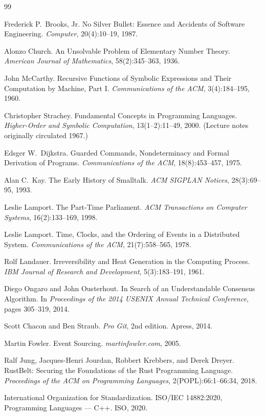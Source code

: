 \documentclass[11pt]{article}
\begin{document}
\begin{thebibliography}{99}

Frederick P.\ Brooks, Jr.
\newblock No Silver Bullet: Essence and Accidents of Software Engineering.
\newblock \emph{Computer}, 20(4):10--19, 1987.

Alonzo Church.
\newblock An Unsolvable Problem of Elementary Number Theory.
\newblock \emph{American Journal of Mathematics}, 58(2):345--363, 1936.

John McCarthy.
\newblock Recursive Functions of Symbolic Expressions and Their Computation by Machine, Part I.
\newblock \emph{Communications of the ACM}, 3(4):184--195, 1960.

Christopher Strachey.
\newblock Fundamental Concepts in Programming Languages.
\newblock \emph{Higher-Order and Symbolic Computation}, 13(1--2):11--49, 2000. (Lecture notes originally circulated 1967.)

Edsger W.\ Dijkstra.
\newblock Guarded Commands, Nondeterminacy and Formal Derivation of Programs.
\newblock \emph{Communications of the ACM}, 18(8):453--457, 1975.

Alan C.\ Kay.
\newblock The Early History of Smalltalk.
\newblock \emph{ACM SIGPLAN Notices}, 28(3):69--95, 1993.

Leslie Lamport.
\newblock The Part-Time Parliament.
\newblock \emph{ACM Transactions on Computer Systems}, 16(2):133--169, 1998.

Leslie Lamport.
\newblock Time, Clocks, and the Ordering of Events in a Distributed System.
\newblock \emph{Communications of the ACM}, 21(7):558--565, 1978.

Rolf Landauer.
\newblock Irreversibility and Heat Generation in the Computing Process.
\newblock \emph{IBM Journal of Research and Development}, 5(3):183--191, 1961.

Diego Ongaro and John Ousterhout.
\newblock In Search of an Understandable Consensus Algorithm.
\newblock In \emph{Proceedings of the 2014 USENIX Annual Technical Conference}, pages 305--319, 2014.

Scott Chacon and Ben Straub.
\newblock \emph{Pro Git}, 2nd edition.
\newblock Apress, 2014.

Martin Fowler.
\newblock Event Sourcing.
\newblock \emph{martinfowler.com}, 2005.

Ralf Jung, Jacques-Henri Jourdan, Robbert Krebbers, and Derek Dreyer.
\newblock RustBelt: Securing the Foundations of the Rust Programming Language.
\newblock \emph{Proceedings of the ACM on Programming Languages}, 2(POPL):66:1--66:34, 2018.

International Organization for Standardization.
\newblock ISO/IEC 14882:2020, Programming Languages --- C++.
\newblock ISO, 2020.

\end{thebibliography}
\end{document}
